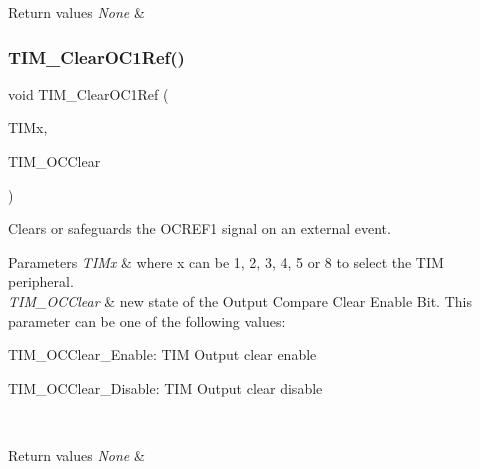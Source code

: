 \begin{DoxyRetVals}{Return values}
{\em None} & \\
\hline
\end{DoxyRetVals}
\mbox{\label{group___t_i_m___exported___functions_ga34e926cd8a99cfcc7480b2d6de5118b6}} 
\subsubsection{\texorpdfstring{TIM\_ClearOC1Ref()}{TIM\_ClearOC1Ref()}}
{\footnotesize\ttfamily void T\+I\+M\+\_\+\+Clear\+O\+C1\+Ref (\begin{DoxyParamCaption}\item[{\mbox{\hyperlink{struct_t_i_m___type_def}{T\+I\+M\+\_\+\+Type\+Def}} $\ast$}]{T\+I\+Mx,  }\item[{uint16\+\_\+t}]{T\+I\+M\+\_\+\+O\+C\+Clear }\end{DoxyParamCaption})}



Clears or safeguards the O\+C\+R\+E\+F1 signal on an external event. 


\begin{DoxyParams}{Parameters}
{\em T\+I\+Mx} & where x can be 1, 2, 3, 4, 5 or 8 to select the T\+IM peripheral. \\
\hline
{\em T\+I\+M\+\_\+\+O\+C\+Clear} & new state of the Output Compare Clear Enable Bit. This parameter can be one of the following values\+: \begin{DoxyItemize}
\item T\+I\+M\+\_\+\+O\+C\+Clear\+\_\+\+Enable\+: T\+IM Output clear enable \item T\+I\+M\+\_\+\+O\+C\+Clear\+\_\+\+Disable\+: T\+IM Output clear disable \end{DoxyItemize}
\\
\hline
\end{DoxyParams}

\begin{DoxyRetVals}{Return values}
{\em None} & \\
\hline
\end{DoxyRetVals}
\mbox{\label{group___t_i_m___exported___functions_gac474ebc815d24c8a589969e0c68b27b0}} 
